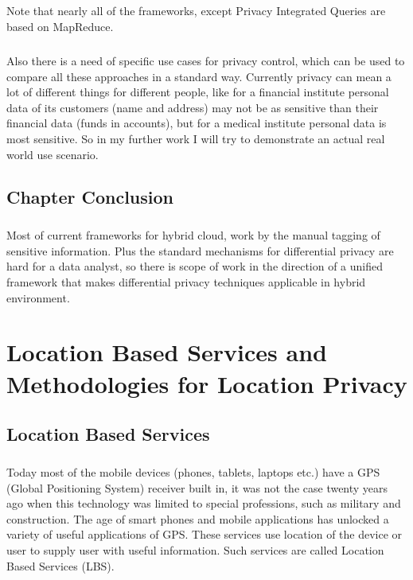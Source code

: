 \documentclass[12pt]{report}
\begin{document}
\paragraph{}
Note that nearly all of the frameworks, except Privacy Integrated Queries are based on MapReduce.
\paragraph{}
Also there is a need of specific use cases for privacy control, which can be used to compare all these approaches in a standard way. Currently privacy can mean a lot of different things for different people, like for a financial institute personal data of its customers (name and address) may not be as sensitive than their financial data (funds in accounts), but for a medical institute personal data is most sensitive. So in my further work I will try to demonstrate an actual real world use scenario.



\section{Chapter Conclusion}
\paragraph{}
Most of current frameworks for hybrid cloud, work by the manual tagging of sensitive information. Plus the standard mechanisms for differential privacy are hard for a data analyst, so there is scope of work in the direction of a unified framework that makes differential privacy techniques applicable in hybrid environment. 






\chapter{Location Based Services and Methodologies for Location Privacy}
\section{Location Based Services}
\paragraph{}
Today most of the mobile devices (phones, tablets, laptops etc.) have a GPS (Global Positioning System) receiver built in, it was not the case twenty years ago when this technology was limited to special professions, such as military and construction. The age of smart phones and mobile applications has unlocked a variety of useful applications of GPS. These services use location of the device or user to supply user with useful information. Such services are called Location Based Services (LBS).
\end{document}
